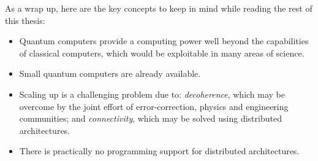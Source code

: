 As a wrap up, here are the key concepts to keep in mind while reading the rest of this thesis:

\begin{itemize}
  \item Quantum computers provide a computing power well beyond the capabilities of classical computers, which would be exploitable in many areas of science.
  \item Small quantum computers are already available. 
  \item Scaling up is a challenging problem due to: \textit{decoherence}, which may be overcome by the joint effort of error-correction, physics and engineering communities; and \textit{connectivity}, which may be solved using distributed architectures.
  \item There is practically no programming support for distributed architectures.
\end{itemize}